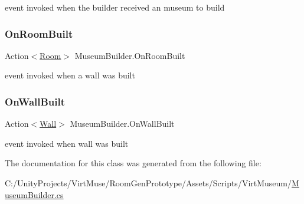 event invoked when the builder received an museum to build 

\mbox{\label{class_museum_builder_a88929a7d394c22ace8a2d34638d14322}} 
\subsubsection{\texorpdfstring{On\+Room\+Built}{OnRoomBuilt}}
{\footnotesize\ttfamily Action$<$\mbox{\hyperlink{class_room}{Room}}$>$ Museum\+Builder.\+On\+Room\+Built}



event invoked when a wall was built 

\mbox{\label{class_museum_builder_a3076208732163cdad7068436b73a5d59}} 
\subsubsection{\texorpdfstring{On\+Wall\+Built}{OnWallBuilt}}
{\footnotesize\ttfamily Action$<$\mbox{\hyperlink{class_wall}{Wall}}$>$ Museum\+Builder.\+On\+Wall\+Built}



event invoked when wall was built 



The documentation for this class was generated from the following file\+:\begin{DoxyCompactItemize}
\item 
C\+:/\+Unity\+Projects/\+Virt\+Muse/\+Room\+Gen\+Prototype/\+Assets/\+Scripts/\+Virt\+Museum/\mbox{\hyperlink{_museum_builder_8cs}{Museum\+Builder.\+cs}}\end{DoxyCompactItemize}
